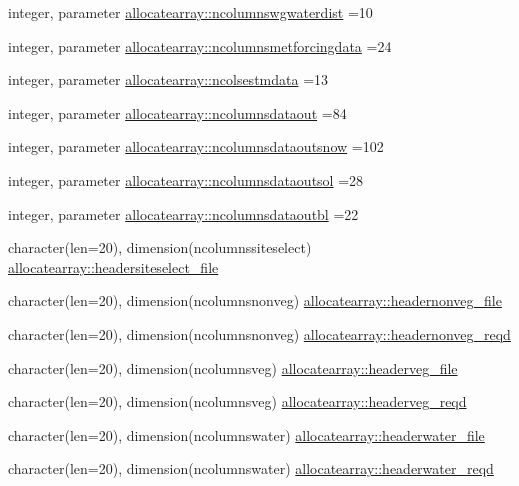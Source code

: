 \begin{DoxyCompactItemize}
\item 
integer, parameter \hyperlink{namespaceallocatearray_a85d1a0c9782006900e2d2a379ba269c8}{allocatearray\+::ncolumnswgwaterdist} =10
\item 
integer, parameter \hyperlink{namespaceallocatearray_a4e277be816ec99df48ea96cc54eb4f62}{allocatearray\+::ncolumnsmetforcingdata} =24
\item 
integer, parameter \hyperlink{namespaceallocatearray_a19316fda887ef62f890249051fdaa79f}{allocatearray\+::ncolsestmdata} =13
\item 
integer, parameter \hyperlink{namespaceallocatearray_a9408900bed6c87ed095d2c688c1506a0}{allocatearray\+::ncolumnsdataout} =84
\item 
integer, parameter \hyperlink{namespaceallocatearray_ab4a2c7e53ba41245b200baa41aed6137}{allocatearray\+::ncolumnsdataoutsnow} =102
\item 
integer, parameter \hyperlink{namespaceallocatearray_a3fbe7b1c5c42eb749b860207893f16cd}{allocatearray\+::ncolumnsdataoutsol} =28
\item 
integer, parameter \hyperlink{namespaceallocatearray_a45295cba02de86a1053db4c80f07ec19}{allocatearray\+::ncolumnsdataoutbl} =22
\item 
character(len=20), dimension(ncolumnssiteselect) \hyperlink{namespaceallocatearray_ad113ac656f4ca34ffd377081c3d86d54}{allocatearray\+::headersiteselect\+\_\+file}
\item 
character(len=20), dimension(ncolumnsnonveg) \hyperlink{namespaceallocatearray_a1acf417768a18d09c33f89053383fd90}{allocatearray\+::headernonveg\+\_\+file}
\item 
character(len=20), dimension(ncolumnsnonveg) \hyperlink{namespaceallocatearray_a13ad90de9ec05be3e8fcce9b8dd62155}{allocatearray\+::headernonveg\+\_\+reqd}
\item 
character(len=20), dimension(ncolumnsveg) \hyperlink{namespaceallocatearray_a48a3f0534f696697267a63f0173f3f23}{allocatearray\+::headerveg\+\_\+file}
\item 
character(len=20), dimension(ncolumnsveg) \hyperlink{namespaceallocatearray_ab4bd7d25443d66ffc38582ff46579d6e}{allocatearray\+::headerveg\+\_\+reqd}
\item 
character(len=20), dimension(ncolumnswater) \hyperlink{namespaceallocatearray_a39b586061937f9441f9d0b7288a71133}{allocatearray\+::headerwater\+\_\+file}
\item 
character(len=20), dimension(ncolumnswater) \hyperlink{namespaceallocatearray_a20a8727d12f806e513fcdbb3ebdc1482}{allocatearray\+::headerwater\+\_\+reqd}

\end{DoxyCompactItemize}
